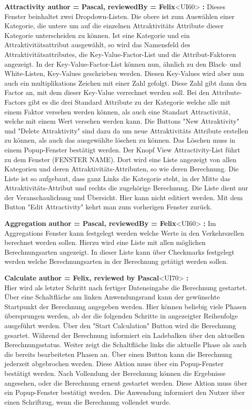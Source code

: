 \documentclass[parskip=full]{scrartcl} %
\begin{document}
\textbf{Attractivity author = Pascal, reviewedBy = Felix}<UI60> \textbf{:}
Dieses Fenster beinhaltet zwei Dropdown-Listen. Die obere ist zum Auswählen einer Kategorie, die untere um auf die einzelnen Attraktivitäts Attribute dieser Kategorie unterscheiden zu können.
Ist eine Kategorie und ein Attraktivitätsattribut ausgewählt, so wird das Namensfeld des Attraktivitätsattributes, die Key-Value-Factor-List und die Attribut-Faktoren angezeigt.
In der Key-Value-Factor-List können nun, ähnlich zu den Black- und White-Listen, Key-Values geschrieben werden. Diesen Key-Values wird aber nun auch ein multiplikations Zeichen mit einer Zahl gefolgt. Diese Zahl gibt dann den Factor an, mit dem dieser Key-Value verrechnet werden soll.
Bei den Attribute-Factors gibt es die drei Standard Attribute zu der Kategorie welche alle mit einem Faktor versehen werden können, als auch eine Standart Attractivität, welche mit einem Wert versehen werden kann.
Die Buttons "New Attraktivity" und "Delete Attraktivity" sind dazu da um neue Attraktivitäts Attribute erstellen zu können, als auch das ausgewählte löschen zu können. Das Löschen muss in einem Popup-Fenster bestätigt werden.
Der Knopf View Attractivity-List führt zu dem Fenster (FENSTER NAME). Dort wird eine Liste angezeigt von allen Kategorien und deren Attraktivitäts-Attributen, so wie deren Berechnung.
Die Liste ist so aufgebaut, dass ganz Links die Kategorie steht, in der Mitte das Attraktivitäts-Attribut und rechts die zugehörige Berechnung.
Die Liste dient nur der Veranschaulichung und Übersicht. Hier kann nicht editiert werden.
Mit dem Button "Edit Attractivity" kehrt man zum vorherigen Fenster zurück.

\textbf{Aggregation author = Pascal, reviewedBy = Felix}<UI60> \textbf{:}
Im Aggregations Fenster kann festgelegt werden welche Werte in den Verkehrszellen berechnet werden sollen. Hierzu wird eine Liste mit allen möglichen Berechnungsarten angezeigt. In dieser Liste kann über Checkmarks festgelegt werden welche Berechnungsarten  in der Berechnung getätigt werden sollen.

\textbf{Calculate author = Felix, reviewed by Pascal}<UI70> \textbf{:}\\
Hier wird als letzter Schritt nach fertiger Dateneingabe die Berechnung gestartet. Über eine Schaltfläche am linken Anwendungsrand kann der gewünschte Startpunkt der Berechnung angegeben werden. Hier können beliebig viele Phasen übersprungen werden, ab der die folgenden Schritte in angezeigter Reihenfolge ausgeführt werden. Über den "Start Calculation" Button wird die Berechnung gesartet.
Während der Berechnung informiert ein Ladebalken über den aktuellen Berechnungsstatus. Weiter zeigt die Schaltfläche links die aktuelle Phase als auch die bereits bearbeiteten Phasen an. Über einen Button kann die Berechnung jederzeit abgebrochen werden. Diese Aktion muss über ein Popup-Fenster bestätigt werden.
Nach Vollendung der Berechnung können die Ergebnisse angesehen, oder die Berechnung erneut gestartet werden. Diese Aktion muss über ein Popup-Fenster bestätigt werden.
Die Anwendung informiert den Nutzer über einen Schriftzug, wenn die Berechnung vollendet wurde.
\end{document}
